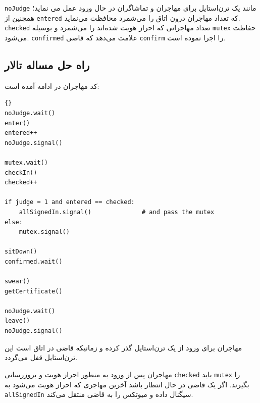 \documentclass{book}
\newcommand{\clearemptydoublepage}{\newpage\cleardoublepage}
\begin{document}

    {\tt noJudge} 
    مانند یک ترن‌استایل برای مهاجران و تماشاگران در حال ورود عمل می نماید؛ همچنین از {\tt entered} که تعداد مهاجران درون اتاق را می‌شمرد 
    محافظت می‌نماید.  {\tt checked} تعداد مهاجرانی که احراز هویت شده‌اند را می‌شمرد و بوسیله {\tt mutex} حفاظت می‌شود. 
    {\tt confirmed}
    علامت می‌دهد که قاضی {\tt confirm} را اجرا نموده است. 

\clearemptydoublepage
\subsection{راه حل مساله تالار }

    کد مهاجران در ادامه آمده است:

\begin{latin}
\begin{lstlisting}[title=\rl{راهنمایی مساله تالار \lr{Faneuil} (مهاجر)}]{}
noJudge.wait()
enter()
entered++
noJudge.signal()

mutex.wait()
checkIn()
checked++

if judge = 1 and entered == checked:
    allSignedIn.signal()              # and pass the mutex
else:
    mutex.signal()

sitDown()
confirmed.wait()

swear()
getCertificate()

noJudge.wait()
leave()
noJudge.signal()
\end{lstlisting}
\end{latin}

    مهاجران برای ورود از یک ترن‌استایل گذر کرده و زمانیکه قاضی در اتاق است این ترن‌استایل قفل می‌گردد.

    مهاجران پس از ورود به منظور احراز هویت و بروزرسانی {\tt checked} باید  {\tt mutex} را بگیرند. اگر یک قاضی در حال انتظار باشد  آخرین مهاجری 
    که احراز هویت می‌شود به  {\tt allSignedIn} سیگنال داده و میوتکس را به قاضی منتقل می‌کند. 
\end{document}
